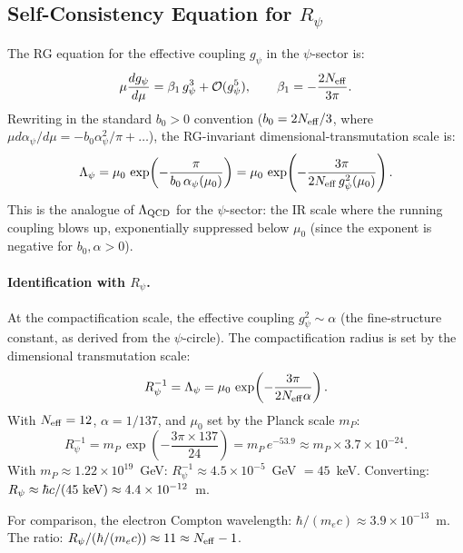 \documentclass[12pt]{article}
\theoremstyle{definition}
\theoremstyle{remark}
\begin{document}
\subsection{Self-Consistency Equation for $R_\psi$}

The RG equation for the effective coupling $g_\psi$ in the $\psi$-sector is:
\begin{equation}
  \mu\frac{dg_\psi}{d\mu}
  = \beta_1\,g_\psi^3 + \mathcal{O}(g_\psi^5),
  \qquad \beta_1 = -\frac{2N_{\rm eff}}{3\pi}.
  \label{eq:beta_psi}
\end{equation}
Rewriting in the standard $b_0 > 0$ convention ($b_0 = 2N_{\rm eff}/3$,
where $\mu d\alpha_\psi/d\mu = -b_0\alpha_\psi^2/\pi + \ldots$),
the RG-invariant dimensional-transmutation scale is:
\begin{equation}
  \Lambda_\psi
  = \mu_0\,\exp\!\left(-\frac{\pi}{b_0\,\alpha_\psi(\mu_0)}\right)
  = \mu_0\,\exp\!\left(-\frac{3\pi}{2N_{\rm eff}\,g_\psi^2(\mu_0)}\right).
  \label{eq:Lambda_psi}
\end{equation}
This is the analogue of $\Lambda_{\rm QCD}$ for the $\psi$-sector: the IR
scale where the running coupling blows up, exponentially suppressed below
$\mu_0$ (since the exponent is negative for $b_0, \alpha > 0$).

\paragraph{Identification with $R_\psi$.}
At the compactification scale, the effective coupling $g_\psi^2 \sim \alpha$
(the fine-structure constant, as derived from the $\psi$-circle).  The
compactification radius is set by the dimensional transmutation scale:
\begin{equation}
  R_\psi^{-1} = \Lambda_\psi
  = \mu_0\,\exp\!\left(-\frac{3\pi}{2N_{\rm eff}\alpha}\right).
  \label{eq:Rpsi_from_Lambda}
\end{equation}
With $N_{\rm eff} = 12$, $\alpha = 1/137$, and $\mu_0$ set by the Planck scale
$m_P$:
\begin{equation}
  R_\psi^{-1}
  = m_P\,\exp\!\left(-\frac{3\pi\times 137}{24}\right)
  = m_P\,e^{-53.9}
  \approx m_P \times 3.7\times10^{-24}.
  \label{eq:Rpsi_numerical}
\end{equation}
With $m_P \approx 1.22\times10^{19}$~GeV:
$R_\psi^{-1} \approx 4.5\times10^{-5}$~GeV $= 45$~keV.
Converting: $R_\psi \approx \hbar c / (45~{\rm keV}) \approx 4.4\times10^{-12}$~m.

For comparison, the electron Compton wavelength: $\hbar/(m_e c) \approx 3.9\times10^{-13}$~m.
The ratio: $R_\psi/(\hbar/(m_e c)) \approx 11 \approx N_{\rm eff} - 1$.
\end{document}
